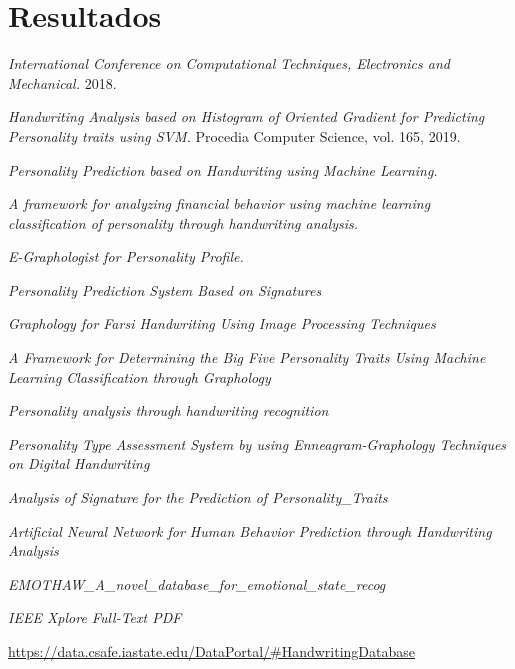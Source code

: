 \documentclass[10pt, a4paper]{article}
\begin{document}
\section{Resultados}

\begin{thebibliography}{99}
         \emph{International Conference on Computational Techniques, Electronics and Mechanical.} 2018. 
    
         \emph{Handwriting Analysis based on Histogram of Oriented Gradient for Predicting Personality traits using SVM.} Procedia Computer Science, vol. 165, 2019.
    
         \emph{Personality Prediction based on Handwriting using Machine Learning.}
        
         \emph{A framework for analyzing financial behavior using machine learning classification of personality through handwriting analysis.}
    
         \emph{E-Graphologist for Personality Profile.}

          \emph{Personality Prediction System Based on Signatures}
        
          \emph{Graphology for Farsi Handwriting Using Image Processing Techniques    }
        
          \emph{A Framework for Determining the Big Five Personality Traits Using Machine Learning Classification through Graphology}
        
          \emph{Personality analysis through handwriting recognition}
        
         \emph{Personality Type Assessment System by using  Enneagram-Graphology Techniques on Digital  Handwriting}
        
         \emph{Analysis of Signature for the Prediction of Personality\_Traits}
        
         \emph{Artificial Neural Network for Human Behavior Prediction  through Handwriting Analysis}
        
         \emph{EMOTHAW\_A\_novel\_database\_for\_emotional\_state\_recog}
        
         \emph{IEEE Xplore Full-Text PDF}
        
         \url{https://data.csafe.iastate.edu/DataPortal/#HandwritingDatabase} 
        

\end{thebibliography}
\end{document}
